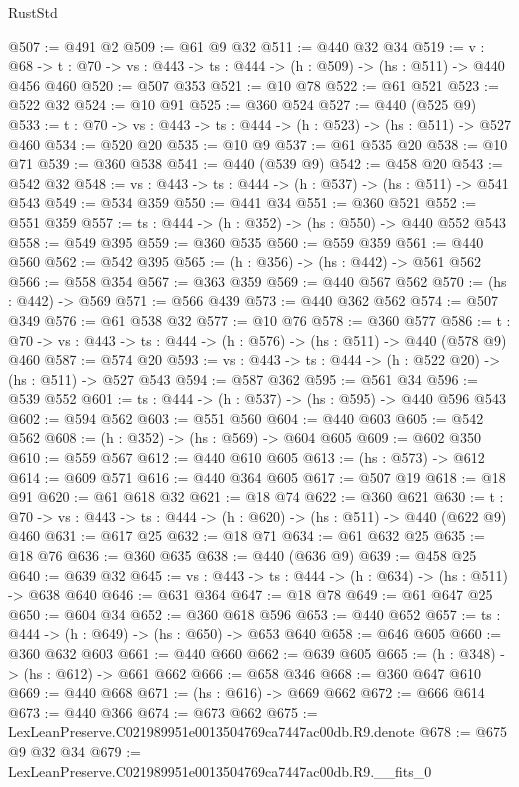 \begin{lexlean}{RustStd}
\begin{coremodule}
@507 := @491 @2
@509 := @61 @9 @32
@511 := @440 @32 @34
@519 := {v : @68} ->
  {t : @70} -> {vs : @443} -> {ts : @444} -> (h : @509) -> (hs : @511) -> @440 @456 @460
@520 := @507 @353
@521 := @10 @78
@522 := @61 @521
@523 := @522 @32
@524 := @10 @91
@525 := @360 @524
@527 := @440 (@525 @9)
@533 := {t : @70} -> {vs : @443} -> {ts : @444} -> (h : @523) -> (hs : @511) -> @527 @460
@534 := @520 @20
@535 := @10 @9
@537 := @61 @535 @20
@538 := @10 @71
@539 := @360 @538
@541 := @440 (@539 @9)
@542 := @458 @20
@543 := @542 @32
@548 := {vs : @443} -> {ts : @444} -> (h : @537) -> (hs : @511) -> @541 @543
@549 := @534 @359
@550 := @441 @34
@551 := @360 @521
@552 := @551 @359
@557 := {ts : @444} -> (h : @352) -> (hs : @550) -> @440 @552 @543
@558 := @549 @395
@559 := @360 @535
@560 := @559 @359
@561 := @440 @560
@562 := @542 @395
@565 := (h : @356) -> (hs : @442) -> @561 @562
@566 := @558 @354
@567 := @363 @359
@569 := @440 @567 @562
@570 := (hs : @442) -> @569
@571 := @566 @439
@573 := @440 @362 @562
@574 := @507 @349
@576 := @61 @538 @32
@577 := @10 @76
@578 := @360 @577
@586 := {t : @70} -> {vs : @443} -> {ts : @444} -> (h : @576) -> (hs : @511) -> @440 (@578 @9) @460
@587 := @574 @20
@593 := {vs : @443} -> {ts : @444} -> (h : @522 @20) -> (hs : @511) -> @527 @543
@594 := @587 @362
@595 := @561 @34
@596 := @539 @552
@601 := {ts : @444} -> (h : @537) -> (hs : @595) -> @440 @596 @543
@602 := @594 @562
@603 := @551 @560
@604 := @440 @603
@605 := @542 @562
@608 := (h : @352) -> (hs : @569) -> @604 @605
@609 := @602 @350
@610 := @559 @567
@612 := @440 @610 @605
@613 := (hs : @573) -> @612
@614 := @609 @571
@616 := @440 @364 @605
@617 := @507 @19
@618 := @18 @91
@620 := @61 @618 @32
@621 := @18 @74
@622 := @360 @621
@630 := {t : @70} -> {vs : @443} -> {ts : @444} -> (h : @620) -> (hs : @511) -> @440 (@622 @9) @460
@631 := @617 @25
@632 := @18 @71
@634 := @61 @632 @25
@635 := @18 @76
@636 := @360 @635
@638 := @440 (@636 @9)
@639 := @458 @25
@640 := @639 @32
@645 := {vs : @443} -> {ts : @444} -> (h : @634) -> (hs : @511) -> @638 @640
@646 := @631 @364
@647 := @18 @78
@649 := @61 @647 @25
@650 := @604 @34
@652 := @360 @618 @596
@653 := @440 @652
@657 := {ts : @444} -> (h : @649) -> (hs : @650) -> @653 @640
@658 := @646 @605
@660 := @360 @632 @603
@661 := @440 @660
@662 := @639 @605
@665 := (h : @348) -> (hs : @612) -> @661 @662
@666 := @658 @346
@668 := @360 @647 @610
@669 := @440 @668
@671 := (hs : @616) -> @669 @662
@672 := @666 @614
@673 := @440 @366
@674 := @673 @662
@675 := LexLeanPreserve.C021989951e0013504769ca7447ac00db.R9.denote
@678 := @675 @9 @32 @34
@679 := LexLeanPreserve.C021989951e0013504769ca7447ac00db.R9.__fits_0

\end{coremodule}
\end{lexlean}
